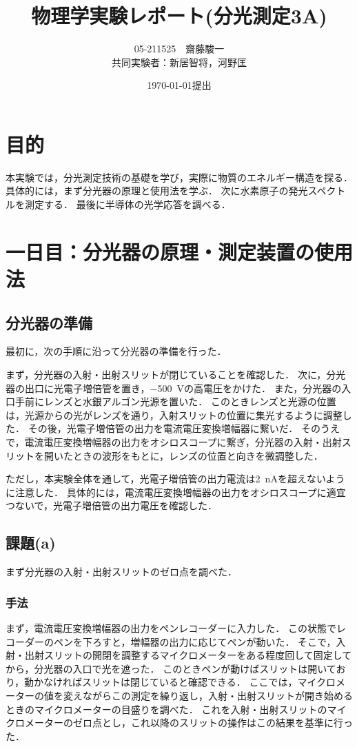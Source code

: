 \documentclass[titlepage]{jsarticle}
\begin{document}
\title{物理学実験レポート(分光測定3A)}
\author{05-211525　齋藤駿一 \\
  共同実験者：新居智将，河野匡}
\date{\today 提出}
\maketitle

\section{目的}
本実験では，分光測定技術の基礎を学び，実際に物質のエネルギー構造を探る．
具体的には，まず分光器の原理と使用法を学ぶ．
次に水素原子の発光スペクトルを測定する．
最後に半導体の光学応答を調べる．

\section{一日目：分光器の原理・測定装置の使用法}

\subsection{分光器の準備}
最初に，次の手順に沿って分光器の準備を行った．

まず，分光器の入射・出射スリットが閉じていることを確認した．
次に，分光器の出口に光電子増倍管を置き，\SI{-500}{V}の高電圧をかけた．
また，分光器の入口手前にレンズと水銀アルゴン光源を置いた．
このときレンズと光源の位置は，光源からの光がレンズを通り，入射スリットの位置に集光するように調整した．
その後，光電子増倍管の出力を電流電圧変換増幅器に繋いだ．
そのうえで，電流電圧変換増幅器の出力をオシロスコープに繋ぎ，分光器の入射・出射スリットを開いたときの波形をもとに，レンズの位置と向きを微調整した．

ただし，本実験全体を通して，光電子増倍管の出力電流は\SI{2}{nA}を超えないように注意した．
具体的には，電流電圧変換増幅器の出力をオシロスコープに適宜つないで，光電子増倍管の出力電圧を確認した．

\subsection{課題(a)}
まず分光器の入射・出射スリットのゼロ点を調べた．

\subsubsection{手法}
まず，電流電圧変換増幅器の出力をペンレコーダーに入力した．
この状態でレコーダーのペンを下ろすと，増幅器の出力に応じてペンが動いた．
そこで，入射・出射スリットの開閉を調整するマイクロメーターをある程度回して固定してから，分光器の入口で光を遮った．
このときペンが動けばスリットは開いており，動かなければスリットは閉じていると確認できる．
ここでは，マイクロメーターの値を変えながらこの測定を繰り返し，入射・出射スリットが開き始めるときのマイクロメーターの目盛りを調べた．
これを入射・出射スリットのマイクロメーターのゼロ点とし，これ以降のスリットの操作はこの結果を基準に行った．
\end{document}
